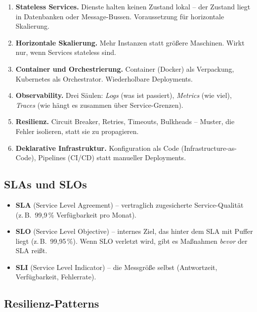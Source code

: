 \documentclass[11pt,a4paper,oneside]{article}
\newcommand{\fachbegriff}[1]{\textbf{#1}}
\begin{document}
\begin{enumerate}
  \item \fachbegriff{Stateless Services.} Dienste halten keinen Zustand lokal -- der Zustand liegt in Datenbanken oder Message-Bussen. Voraussetzung für horizontale Skalierung.
  \item \fachbegriff{Horizontale Skalierung.} Mehr Instanzen statt größere Maschinen. Wirkt nur, wenn Services stateless sind.
  \item \fachbegriff{Container und Orchestrierung.} Container (Docker) als Verpackung, Kubernetes als Orchestrator. Wiederholbare Deployments.
  \item \fachbegriff{Observability.} Drei Säulen: \emph{Logs} (was ist passiert), \emph{Metrics} (wie viel), \emph{Traces} (wie hängt es zusammen über Service-Grenzen).
  \item \fachbegriff{Resilienz.} Circuit Breaker, Retries, Timeouts, Bulkheads -- Muster, die Fehler isolieren, statt sie zu propagieren.
  \item \fachbegriff{Deklarative Infrastruktur.} Konfiguration als Code (Infrastructure-as-Code), Pipelines (CI/CD) statt manueller Deployments.
\end{enumerate}

\subsection{SLAs und SLOs}

\begin{itemize}
  \item \fachbegriff{SLA} (Service Level Agreement) -- vertraglich zugesicherte Service-Qualität (z.\,B.\ 99,9\,\% Verfügbarkeit pro Monat).
  \item \fachbegriff{SLO} (Service Level Objective) -- internes Ziel, das hinter dem SLA mit Puffer liegt (z.\,B.\ 99,95\,\%). Wenn SLO verletzt wird, gibt es Maßnahmen \emph{bevor} der SLA reißt.
  \item \fachbegriff{SLI} (Service Level Indicator) -- die Messgröße selbst (Antwortzeit, Verfügbarkeit, Fehlerrate).
\end{itemize}

\subsection{Resilienz-Patterns}
\end{document}
